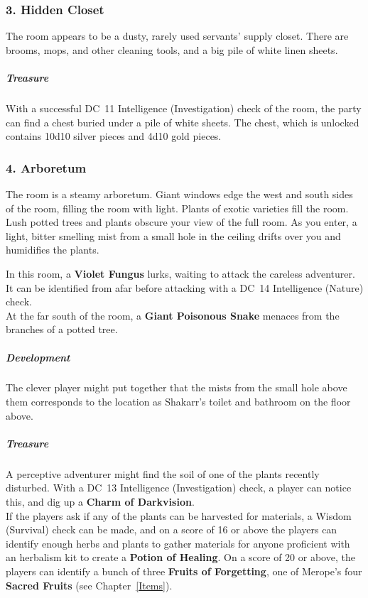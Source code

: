 \subsubsection{3. Hidden Closet}
\begin{DndReadAloud}
  The room appears to be a dusty, rarely used servants' supply closet. There are brooms, mops, and other cleaning tools, and a big pile of white linen sheets. 
\end{DndReadAloud}
\subparagraph{Treasure} With a successful DC~11 Intelligence (Investigation) check of the room, the party can find a chest buried under a pile of white sheets. The chest, which is unlocked contains 10d10 silver pieces and 4d10 gold pieces.
\subsubsection{4. Arboretum}
\begin{DndReadAloud}
  The room is a steamy arboretum. Giant windows edge the west and south sides of the room, filling the room with light. Plants of exotic varieties fill the room. Lush potted trees and plants obscure your view of the full room. As you enter, a light, bitter smelling mist from a small hole in the ceiling drifts over you and humidifies the plants.
\end{DndReadAloud}
In this room, a \textbf{Violet Fungus} lurks, waiting to attack the careless adventurer. It can be identified from afar before attacking with a DC~14 Intelligence (Nature) check.\\
At the far south of the room, a \textbf{Giant Poisonous Snake} menaces from the branches of a potted tree.\\
\subparagraph{Development}
The clever player might put together that the mists from the small hole above them corresponds to the location as Shakarr's toilet and bathroom on the floor above.
\subparagraph{Treasure} A perceptive adventurer might find the soil of one of the plants recently disturbed. With a DC~13 Intelligence (Investigation) check, a player can notice this, and dig up a \textbf{Charm of Darkvision}.\\
If the players ask if any of the plants can be harvested for materials, a Wisdom (Survival) check can be made, and on a score of 16 or above the players can identify enough herbs and plants to gather materials for anyone proficient with an herbalism kit to create a \textbf{Potion of Healing}. On a score of 20 or above, the players can identify a bunch of three \textbf{Fruits of Forgetting}, one of Merope's four \textbf{Sacred Fruits} (see Chapter~\ref{Items}).
